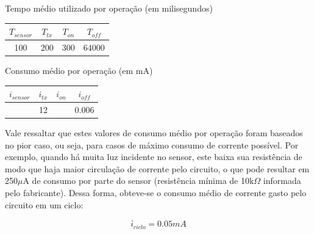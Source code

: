 \documentclass[oneside,openright,12pt]{ufsm_2015} %
\begin{document}
    \begin{quadro}
   	    \caption{Tempo médio utilizado por operação (em milisegundos)}
	    \centering
	    \begin{tabular}{| c |c |c |c |}
	    \hline
	    $T_{sensor}$ & $T_{tx}$ & $T_{on}$ & $T_{off}$ \\
	    \hline
	    100 & 200 & 300 & 64000\\
	    \hline
	    \end{tabular}
	    \vspace{\baselineskip} %
	    \label{quadro:tempos}
    \end{quadro}
    
    \begin{quadro}
   	    \caption{Consumo médio por operação (em mA)}
	    \centering
	    \begin{tabular}{| c |c |c |c |}
	    \hline
	    $i_{sensor}$ & $i_{tx}$ & $i_{on}$ & $i_{off}$ \\
	    \hline
	     & 12 &  & 0.006\\
	    \hline
	    \end{tabular}
	    \vspace{\baselineskip} %
	    \label{quadro:consumos}
    \end{quadro}
    
    Vale ressaltar que estes valores de consumo médio por operação foram baseados no pior caso, ou seja, para casos de máximo consumo de corrente possível. Por exemplo, quando há muita luz incidente no sensor, este baixa sua resistência de modo que haja maior circulação de corrente pelo circuito, o que pode resultar em 250$\mu$A de consumo por parte do sensor (resistência mínima  de 10k$\Omega$ informada pelo fabricante). Dessa forma, obteve-se o consumo médio de corrente gasto pelo circuito em um ciclo:
    
    \begin{equation*}
        \overline{i}_{ciclo} = 0.05mA
    \end{equation*}
    
    
    
\end{document}
